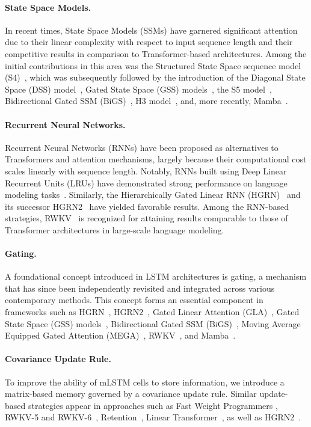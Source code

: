 \paragraph{State Space Models.} In recent times, State Space Models (SSMs) have garnered significant attention due to their linear complexity with respect to input sequence length and their competitive results in comparison to Transformer-based architectures. Among the initial contributions in this area was the Structured State Space sequence model (S4)~\citep{Gu:21}, which was subsequently followed by the introduction of the Diagonal State Space (DSS) model~\citep{Gupta:22}, Gated State Space (GSS) models~\citep{Mehta:22}, the S5 model~\citep{Smith:22}, Bidirectional Gated SSM (BiGS)~\citep{Wang:22}, H3 model~\citep{Fu:23}, and, more recently, Mamba~\citep{Gu:24arxiv}.

\paragraph{Recurrent Neural Networks.} Recurrent Neural Networks (RNNs) have been proposed as alternatives to Transformers and attention mechanisms, largely because their computational cost scales linearly with sequence length. Notably, RNNs built using Deep Linear Recurrent Units (LRUs) have demonstrated strong performance on language modeling tasks~\citep{Orvieto:23, De:24arxiv}. Similarly, the Hierarchically Gated Linear RNN (HGRN)~\citep{Qin:23} and its successor HGRN2~\citep{Qin:24arxiv} have yielded favorable results. Among the RNN-based strategies, RWKV~\citep{Peng:23arxivshort,Peng:24arxivshort} is recognized for attaining results comparable to those of Transformer architectures in large-scale language modeling.

\paragraph{Gating.}
A foundational concept introduced in LSTM architectures is gating, a mechanism that has since been independently revisited and integrated across various contemporary methods. This concept forms an essential component in frameworks such as HGRN~\citep{Qin:23}, HGRN2~\citep{Qin:24arxiv}, Gated Linear Attention (GLA)~\citep{Yang:23arxiv}, Gated State Space (GSS) models~\citep{Mehta:22}, Bidirectional Gated SSM (BiGS)~\citep{Wang:22}, Moving Average Equipped Gated Attention (MEGA)~\citep{Ma:22}, RWKV~\citep{Peng:23arxivshort}, and Mamba~\citep{Gu:24arxiv}.

\paragraph{Covariance Update Rule.}
To improve the ability of mLSTM cells to store information, we introduce a matrix-based memory governed by a covariance update rule. Similar update-based strategies appear in approaches such as Fast Weight Programmers \citep{Schmidhuber:92ncfastweights,Schlag:21}, RWKV-5 and RWKV-6~\citep{Peng:24arxivshort}, Retention~\citep{Sun:23arxiv}, Linear Transformer~\citep{Katharopoulos:20}, as well as HGRN2~\citep{Qin:24arxiv}.

